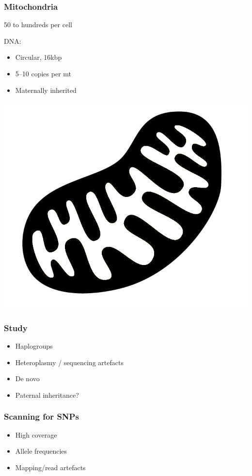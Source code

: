 \documentclass[slidestop,14pt]{beamer}
\begin{document}
\begin{frame}
  \frametitle{Mitochondria}

  \vspace{\baselineskip}

  50 to hundreds per cell

  \vspace{0.5\baselineskip}

  DNA:
  \begin{itemize}
    \item Circular, 16kbp
    \item 5--10 copies per mt
    \item Maternally inherited
  \end{itemize}

  \vspace{-\baselineskip}

  \hspace{0.6\linewidth}\includegraphics[width=0.3\linewidth,transparent]{mitochondrion.png}
\end{frame}

\begin{frame}
  \frametitle{Study}

  \vspace{\baselineskip}

  \begin{itemize}
    \item Haplogroups
    \item Heteroplasmy / sequencing artefacts
    \item De novo
    \item Paternal inheritance?
  \end{itemize}

\end{frame}

\begin{frame}
  \frametitle{Scanning for SNPs}

  \vspace{\baselineskip}

  \begin{itemize}
    \item High coverage
    \item Allele frequencies
    \item Mapping/read artefacts
  \end{itemize}
\end{frame}
\end{document}
